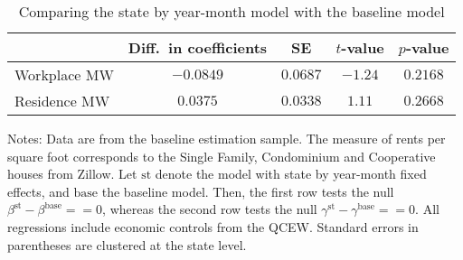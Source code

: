 \begin{table}[hbt!]
    \centering
    \caption{Comparing the state by year-month model with the baseline model}
    \label{tab:test_stateFE}

    \begin{tabular}{@{}lcccc@{}}
        \toprule
                     & Diff.\ in coefficients & SE & $t$-value & $p$-value \\ \midrule
        Workplace MW &  $-0.0849$ & $0.0687$ & $-1.24$ & $0.2168$ \\
        Residence MW &  $0.0375$ & $0.0338$ & $1.11$ & $0.2668$ \\ \bottomrule
    \end{tabular}

    \begin{minipage}{.95\textwidth} \footnotesize
        \vspace{2mm}
        Notes: 
        Data are from the baseline estimation sample.
        The measure of rents per square foot corresponds to the Single Family, 
        Condominium and Cooperative houses from Zillow.
        Let $\text{st}$ denote the model with state by year-month fixed effects,
        and $\text{base}$ the baseline model.
        Then, the first row tests the null $\beta^{\text{st}} - \beta^{\text{base}} == 0$,
        whereas the second row tests the null $\gamma^{\text{st}} - \gamma^{\text{base}} == 0$.
        All regressions include economic controls from the QCEW.
        Standard errors in parentheses are clustered at the state level.
    \end{minipage}
\end{table}

